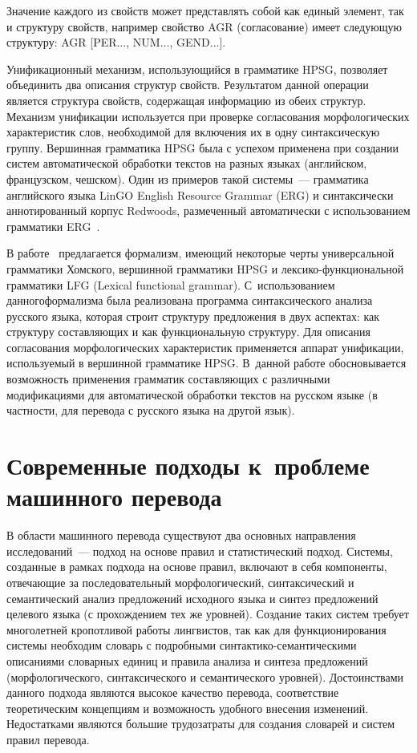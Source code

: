 \begin{multicols}{2}
     Значение каждого из свойств может пред\-став\-лять собой как единый 
элемент, так и структуру свойств, например свойство AGR (согласование) 
имеет следующую структуру: AGR [PER$\ldots$, NUM$\ldots$, 
GEND$\ldots$].
     
     Унификационный механизм, использующийся в грамматике HPSG, 
позволяет объединить два описания структур свойств. Результатом данной 
операции является структура свойств, содержащая информацию из обеих 
структур. Механизм унификации используется при проверке согласования 
морфологических характеристик слов, необходимой для включения их в одну 
синтаксическую группу. Вершинная грамматика HPSG была с успехом 
применена при создании сис\-тем автоматической обработки текстов на 
разных языках (английском, французском, чешском). Один из примеров такой 
сис\-те\-мы~--- грамматика английского языка \mbox{LinGO} English Resource Grammar 
(ERG) и синтаксически аннотированный корпус Redwoods, размеченный 
автоматически с использованием грамматики ERG~\cite{7-mor}.
     
     В работе~\cite{8-mor} предлагается формализм, име\-ющий некоторые 
черты универсальной грамматики Хомского, вершинной грамматики HPSG и 
лек\-сико-функ\-ци\-о\-наль\-ной грамматики LFG
(Lexical functional grammar). С~использованием 
данного\linebreak формализма была реализована программа синтаксического анализа 
русского языка, которая строит структуру предложения в двух аспектах: как 
структуру составляющих и как функциональную структуру. Для описания 
согласования морфологических характеристик применяется аппарат 
унификации, используемый в вершинной грамматике HPSG. В~данной 
работе обосновывается возможность применения грамматик составляющих с 
различными модификациями для автоматической обработки текстов на 
русском языке (в частности, для перевода с русского языка на другой язык).

\section{Современные подходы к~проблеме машинного перевода}
     
     В области машинного перевода существуют два основных направления 
исследований~--- подход на основе правил и статистический подход. 
Системы, созданные в рамках подхода на основе правил, включают в себя 
компоненты, отвечающие за последовательный морфологический, 
синтаксический и семантический анализ предложений исходного языка и 
синтез предложений целевого языка (с прохождением тех же уровней). 
Создание таких сис\-тем требует многолетней кропотливой работы 
лингвистов, так как для функционирования сис\-те\-мы необходим словарь с 
подробными син\-так\-ти\-ко-се\-ман\-ти\-че\-ски\-ми описаниями словарных 
единиц и правила анализа и синтеза предложений (морфологического, 
синтаксического и семантического уров\-ней). Достоинствами данного 
подхода являются высокое качество перевода, соответствие теоретическим 
концепциям и возможность удобного внесения изменений. Недостатками 
являются большие трудозатраты для создания словарей и сис\-тем правил 
перевода. 
     

\end{multicols}
